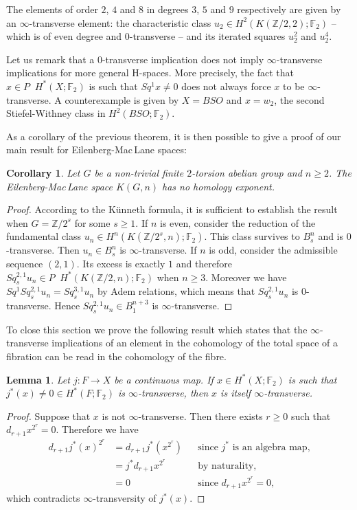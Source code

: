 \documentclass{amsart}
\newtheorem{lem}[thm]{Lemma}
\newtheorem*{cor*}{Corollary}
\theoremstyle{definition}
\theoremstyle{remark}
\DeclareMathOperator{\even}{^{even}}
\newcommand{\Z}{\mathbb{Z}}
\newcommand{\F}{\mathbb{F}}
\renewcommand{\geq}{\geqslant}
\begin{document}
The elements of order $2$, $4$ and $8$ in degrees $3$, $5$ and $9$ respectively are given by an $\infty$-transverse element: the characteristic class $u_2\in H^2(K(\Z/2,2);\F_2)$ -- which is of even degree and $0$-transverse -- and its iterated squares $u_2^2$ and $u_2^4$.

Let us remark that a $0$-transverse implication does not imply $\infty$-transverse implications for more general H-spaces. More precisely, the fact that $x\in P\even H^*(X;\F_2)$ is such that $Sq^1x\not=0$ does not always force $x$ to be $\infty$-transverse. A counterexample is given by $X=BSO$ and $x=w_2$, the second Stiefel-Withney class in $H^2(BSO;\F_2)$.

As a corollary of the previous theorem, it is then possible to give a proof of our main result for Eilenberg-Mac\,Lane spaces:

\begin{cor*}
Let $G$ be a non-trivial finite $2$-torsion abelian group and $n\geq2$. The Eilenberg-Mac\,Lane space $K(G,n)$ has no homology exponent.
\end{cor*}

\begin{proof}
According to the K\"unneth formula, it is sufficient to establish the result when $G=\Z/2^s$ for some $s\geq1$. If $n$ is even, consider the reduction of the fundamental class $u_n\in H^n(K(\Z/2^s,n);\F_2)$. This class survives to $B^n_s$ and is $0$-transverse. Then $u_n\in B^n_s$ is $\infty$-transverse. If $n$ is odd, consider the admissible sequence $(2,1)$. Its excess is exactly $1$ and therefore $Sq^{2,1}_s u_n\in P\even H^*(K(\Z/2,n);\F_2)$ when $n\geq3$. Moreover we have $Sq^1Sq^{2,1}_s u_n=Sq^{3,1}_s u_n$ by Adem relations, which means that $Sq^{2,1}_s u_n$ is $0$-transverse. Hence $Sq^{2,1}_s u_n\in B^{n+3}_1$ is $\infty$-transverse.
\end{proof}

To close this section we prove the following result which states that the $\infty$-transverse implications of an element in the cohomology of the total space of a fibration can be read in the cohomology of the fibre. 

\begin{lem}
Let $j:F\to X$ be a continuous map. If $x\in H^*(X;\F_2)$ is such that $j^*(x)\not=0\in H^*(F;\F_2)$ is $\infty$-transverse, then $x$ is itself $\infty$-transverse.
\end{lem}

\begin{proof} %
Suppose that $x$ is not $\infty$-transverse. Then there exists $r\geq0$ such that $d_{r+1}x^{2^r}=0$. Therefore we have
\begin{align*}
d_{r+1}j^*(x)^{2^r} &=d_{r+1}j^*(x^{2^r}) &&\text{since $j^*$ is an algebra map,}\\
&=j^*d_{r+1}x^{2^r} &&\text{by naturality,}\\
&=0 &&\text{since $d_{r+1}x^{2^r}=0$},
\end{align*} which contradicts $\infty$-transversity of $j^*(x)$.
\end{proof}
\end{document}
